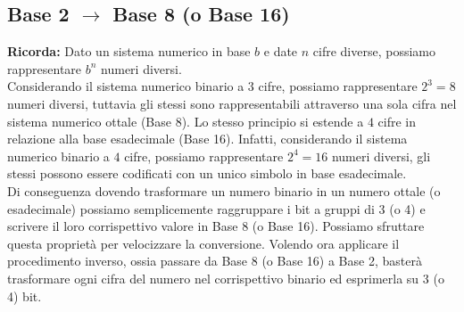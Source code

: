 \documentclass{article}
\begin{document}
\subsection{Base 2 $\rightarrow$ Base 8 (o Base 16)}

\textbf{Ricorda:} Dato un sistema numerico in base $b$ e date $n$ cifre diverse, possiamo rappresentare $b^{n}$ numeri diversi.\\

\noindent Considerando il sistema numerico binario a $3$ cifre, possiamo rappresentare $2^{3}=8$ numeri diversi, tuttavia gli stessi sono rappresentabili attraverso una sola cifra nel sistema numerico ottale (Base 8). Lo stesso principio si estende a $4$ cifre in relazione alla base esadecimale (Base 16). Infatti, considerando il sistema numerico binario a $4$ cifre, possiamo rappresentare $2^{4}=16$ numeri diversi, gli stessi possono essere codificati con un unico simbolo in base esadecimale. \\

\noindent Di conseguenza dovendo trasformare un numero binario in un numero ottale (o esadecimale) possiamo semplicemente raggruppare i bit a gruppi di 3 (o 4) e scrivere il loro corrispettivo valore in Base 8 (o Base 16). Possiamo sfruttare questa propriet\`a per velocizzare la conversione. Volendo ora applicare il procedimento inverso, ossia passare da Base 8 (o Base 16) a Base 2, baster\`a trasformare ogni cifra del numero nel corrispettivo binario ed esprimerla su 3 (o 4) bit.
\end{document}
